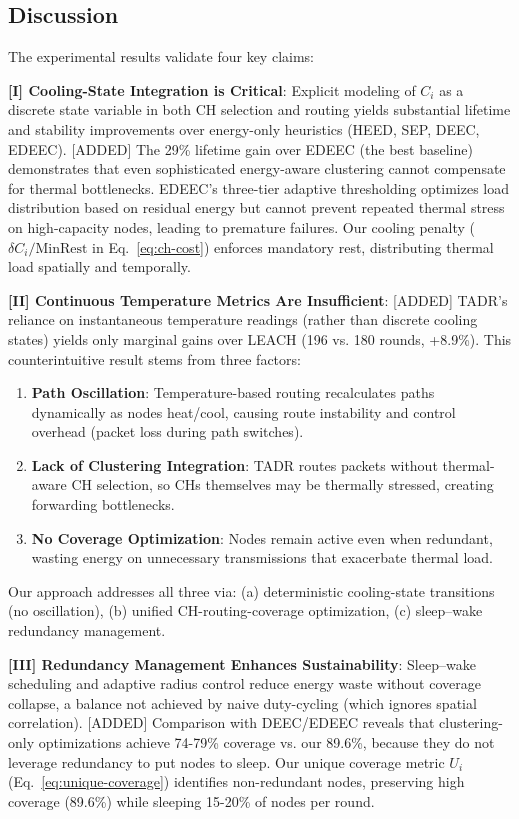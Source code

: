 \subsection{Discussion}
\label{subsec:discussion}

The experimental results validate four key claims:

\textbf{[I] Cooling-State Integration is Critical}: Explicit modeling of $C_i$ as a discrete state variable in both CH selection and routing yields substantial lifetime and stability improvements over energy-only heuristics (HEED, SEP, DEEC, EDEEC). [ADDED] The 29\% lifetime gain over EDEEC (the best baseline) demonstrates that even sophisticated energy-aware clustering cannot compensate for thermal bottlenecks. EDEEC's three-tier adaptive thresholding optimizes load distribution based on residual energy but cannot prevent repeated thermal stress on high-capacity nodes, leading to premature failures. Our cooling penalty ($\delta C_i/\text{MinRest}$ in Eq.~\ref{eq:ch-cost}) enforces mandatory rest, distributing thermal load spatially and temporally.

\textbf{[II] Continuous Temperature Metrics Are Insufficient}: [ADDED] TADR's reliance on instantaneous temperature readings (rather than discrete cooling states) yields only marginal gains over LEACH (196 vs. 180 rounds, +8.9\%). This counterintuitive result stems from three factors:
\begin{enumerate}[label=(\alph*),noitemsep]
  \item \textbf{Path Oscillation}: Temperature-based routing recalculates paths dynamically as nodes heat/cool, causing route instability and control overhead (packet loss during path switches).
  \item \textbf{Lack of Clustering Integration}: TADR routes packets without thermal-aware CH selection, so CHs themselves may be thermally stressed, creating forwarding bottlenecks.
  \item \textbf{No Coverage Optimization}: Nodes remain active even when redundant, wasting energy on unnecessary transmissions that exacerbate thermal load.
\end{enumerate}
Our approach addresses all three via: (a) deterministic cooling-state transitions (no oscillation), (b) unified CH-routing-coverage optimization, (c) sleep--wake redundancy management.

\textbf{[III] Redundancy Management Enhances Sustainability}: Sleep--wake scheduling and adaptive radius control reduce energy waste without coverage collapse, a balance not achieved by naive duty-cycling (which ignores spatial correlation). [ADDED] Comparison with DEEC/EDEEC reveals that clustering-only optimizations achieve 74-79\% coverage vs. our 89.6\%, because they do not leverage redundancy to put nodes to sleep. Our unique coverage metric $U_i$ (Eq.~\ref{eq:unique-coverage}) identifies non-redundant nodes, preserving high coverage (89.6\%) while sleeping 15-20\% of nodes per round.

